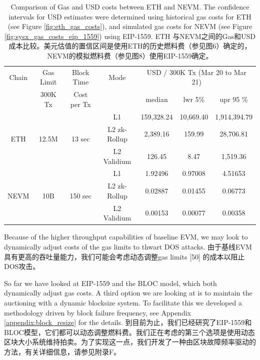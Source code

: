 \documentclass{ctexart}
\begin{document}
\begin{table}[h!]
\centering
\begin{tabular}{ |c|c|c|c|c|c|c|   } 
\hline
Chain & Gas  Limit & Block Time & Mode & \multicolumn{3}{|c|}{USD / 300K Tx (Mar 20 to Mar 21) } \\
 &  300K Tx  & Cost per Tx  &  & median & lwr 5\% &  upr 95 \% \\ 
\hline
\multirow{3}{*}{ETH} & \multirow{3}{*}{12.5M} & \multirow{3}{*}{13 sec} & L1 & 159,328.24 & 10,669.40  & 1,914,394.79  \\
\multirow{3}{*}{} & \multirow{3}{*}{} & \multirow{3}{*}{} & L2 zk-Rollup & 2,389.16 & 159.99  & 28,706.81 \\ 
\multirow{3}{*}{} & \multirow{3}{*}{} & \multirow{3}{*}{} & L2 Validium  & 126.45 & 8.47  & 1,519.36 \\ 
\hline

\multirow{3}{*}{NEVM} & \multirow{3}{*}{10B} & \multirow{3}{*}{150 sec} & L1 & 1.92496 & 0.97008 & 4.51653 \\ 
\multirow{3}{*}{} & \multirow{3}{*}{} & \multirow{3}{*}{} & L2 zk-Rollup & 0.02887 & 0.01455 & 0.06773 \\ 
\multirow{3}{*}{} & \multirow{3}{*}{} & \multirow{3}{*}{} & L2 Validium  & 0.00153 & 0.00077  & 0.00358 \\ 
\hline

\end{tabular}
\caption{Comparison of Gas and USD costs between ETH and NEVM. The confidence intervals for USD estimates were determined using historical gas costs for ETH (see Figure \ref{fig:eth_gas_costs}), and simulated gas costs for NEVM (see Figure \ref{fig:sysx_gas_costs_eip_1559}) using EIP-1559. ETH 与NEVM之间的Gas和USD成本比较。美元估值的置信区间是使用ETH的历史燃料费（参见图6）确定的，NEVM的模拟燃料费（参见图8）使用EIP-1559确定。}
\label{table:gas_cost_estimates}
\end{table}

Because of the higher throughput capabilities of baseline EVM, we may look to dynamically adjust costs of the gas limits \cite{Che17} to thwart DOS attacks. 由于基线EVM具有更高的吞吐量能力，我们可能会考虑动态调整gas limits [50] 的成本以阻止DOS攻击。

So far we have looked at EIP-1559 and the BLOC model, which both dynamically adjust gas costs. A third option we are looking at is to maintain the auctioning with a dynamic blocksize system. To facilitate this we developed a methodology driven by block failure frequency, see Appendix \ref{appendix:block_resize} for the details. 到目前为止，我们已经研究了EIP-1559和BLOC模型，它们都可以动态调整燃料费。我们正在考虑的第三个选项是使用动态区块大小系统维持拍卖。为了实现这一点，我们开发了一种由区块故障频率驱动的方法，有关详细信息，请参见附录F。
\end{document}
